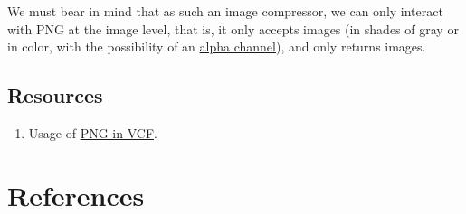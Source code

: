 We must bear in mind that as such an image compressor, we can only
interact with PNG at the image level, that is, it only accepts images
(in shades of gray or in color, with the possibility of an
\href{https://en.wikipedia.org/wiki/Alpha_compositing}{alpha channel}),
and only returns images.

\subsection*{Resources}
\begin{enumerate}
\item Usage of
  \href{https://github.com/Sistemas-Multimedia/VCF/blob/main/notebooks/PNG.ipynb}{PNG
    in VCF}.
\end{enumerate}



\section{References}

\renewcommand{\addcontentsline}[3]{}%

